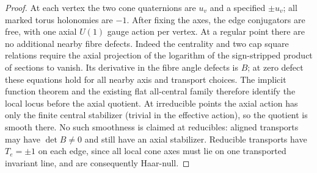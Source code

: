 \begin{proof}
At each vertex the two cone quaternions are \(u_v\) and a specified \(\pm u_v\); all marked torus holonomies are \(-1\). After fixing the axes, the edge conjugators are free, with one axial \(U(1)\) gauge action per vertex. At a regular point there are no additional nearby fibre defects. Indeed the centrality and two cap square relations require the axial projection of the logarithm of the sign-stripped product of sections to vanish. Its derivative in the fibre angle defects is \(B\); at zero defect these equations hold for all nearby axis and transport choices. The implicit function theorem and the existing flat all-central family therefore identify the local locus before the axial quotient. At irreducible points the axial action has only the finite central stabilizer (trivial in the effective action), so the quotient is smooth there. No such smoothness is claimed at reducibles: aligned transports may have \(\det B\ne0\) and still have an axial stabilizer. Reducible transports have \(T_e=\pm1\) on each edge, since all local cone axes must lie on one transported invariant line, and are consequently Haar-null.


\end{proof}
